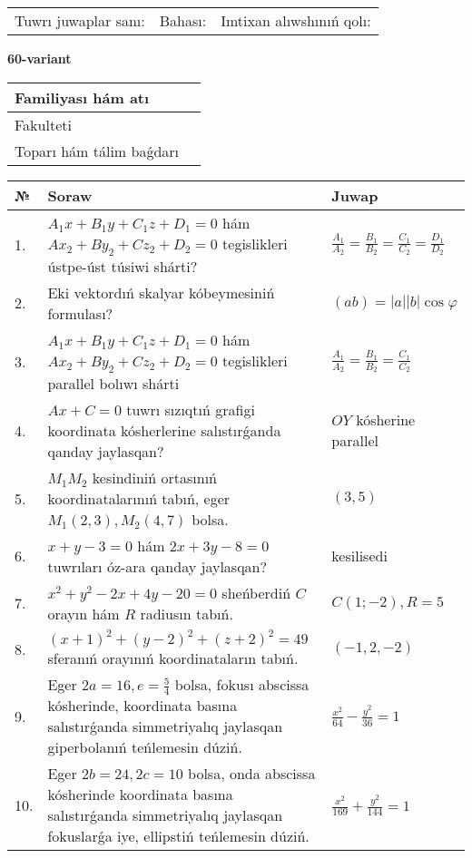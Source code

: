 \documentclass{article}
\begin{document}
\vspace{1cm}

\begin{tabular}{lll}
Tuwrı juwaplar sanı: \underline{\hspace{1.5cm}} & 
Bahası: \underline{\hspace{1.5cm}} & 
Imtixan alıwshınıń qolı: \underline{\hspace{2cm}} \\
\end{tabular}

\egroup

\newpage


\textbf{60-variant}\\

\bgroup
\def\arraystretch{1.6} %

\begin{tabular}{|m{5.7cm}|m{9.5cm}|}
\hline
Familiyası hám atı & \\
\hline
Fakulteti  & \\
\hline
Toparı hám tálim baǵdarı  & \\
\hline
\end{tabular}

\vspace{1cm}

\begin{tabular}{|m{0.7cm}|m{10cm}|m{4cm}|}
\hline
№ & Soraw & Juwap \\
\hline
1. & $A_1x+B_1y+C_1z+D_1=0$ hám $Ax_2+By_2+Cz_2+D_2=0$ tegislikleri ústpe-úst túsiwi shárti? & $\frac{A_1}{A_2}=\frac{B_1}{B_2}=\frac{C_1}{C_2}=\frac{D_1}{D_2}$ \\
\hline
2. & Eki vektordıń skalyar kóbeymesiniń formulası? & $(ab)=|a||b|\cos\varphi$ \\
\hline
3. & $A_1x+B_1y+C_1z+D_1=0$ hám $Ax_2+By_2+Cz_2+D_2=0$ tegislikleri parallel bolıwı shárti & $\frac{A_1}{A_2}=\frac{B_1}{B_2}=\frac{C_1}{C_2}$ \\
\hline
4. & $Ax+C=0$ tuwrı sızıqtıń grafigi koordinata kósherlerine salıstırǵanda qanday jaylasqan? & $OY$ kósherine parallel \\
\hline
5. & $M_{1}M_{2}$ kesindiniń ortasınıń koordinatalarınıń tabıń, eger $M_{1} (2, 3), M_{2} (4, 7)$ bolsa. & $(3,5)$ \\
\hline
6. & $x+y-3=0$ hám $2x+3y-8=0$ tuwrıları óz-ara qanday jaylasqan? & kesilisedi \\
\hline
7. & $x^{2}+y^{2}-2x+4y-20=0$ sheńberdiń $C$ orayın hám $R$ radiusın tabıń. & $C(1;-2), R=5$ \\
\hline
8. & $(x+1)^{2}+(y-2) ^{2}+(z+2) ^{2}=49$ sferanıń orayınıń koordinataların tabıń. & $(-1,2,-2)$ \\
\hline
9. & Eger $2a=16, e=\frac{5}{4}$ bolsa, fokusı abscissa kósherinde, koordinata basına salıstırǵanda simmetriyalıq jaylasqan giperbolanıń teńlemesin dúziń. & $\frac{x^{2}}{64}-\frac{y^{2}}{36}=1$ \\
\hline
10. & Eger $2b=24, 2 c=10$ bolsa, onda abscissa kósherinde koordinata basına salıstırǵanda simmetriyalıq jaylasqan fokuslarǵa iye, ellipstiń teńlemesin dúziń. & $\frac{x^{2}}{169}+\frac{y^{2}}{144}=1$ \\
\hline
\end{tabular}
\end{document}
